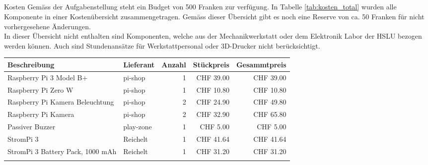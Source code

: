 \documentclass[../../main.tex]{subfiles}
\begin{document}
\subsection{}{Kosten}
Gemäss der Aufgabenstellung steht ein Budget von 500 Franken zur verfügung. In Tabelle \ref{tab:kosten_total} wurden alle Komponente in einer Kostenübersicht zusammengetragen. Gemäss dieser Übersicht gibt es noch eine Reserve von ca. 50 Franken für nicht vorhergesehene Änderungen.\\
In dieser Übersicht nicht enthalten sind Komponenten, welche aus der Mechanikwerkstatt oder dem Elektronik Labor der
HSLU bezogen werden können. Auch sind Stundenansätze für Werkstattpersonal oder 3D-Drucker nicht berücksichtigt. \\

\begin{table}[H] \centering
    \begin{tabular}{|p{6cm}|l|r|r|r|}
    \hline
    \textbf{Beschreibung}                                   & \textbf{Lieferant} & \textbf{Anzahl} & \textbf{Stückpreis} & \textbf{Gesammtpreis} \\ \hline
    Raspberry Pi 3 Model B+                                 & pi-shop            & 1               & CHF 39.00           & CHF 39.00             \\ \hline \nocite{PiShopPi3ModelBp}
    Raspberry Pi Zero W                                     & pi-shop            & 1               & CHF 10.80           & CHF 10.80             \\ \hline \nocite{PiShopPiZero}
    Raspberry Pi Kamera Beleuchtung                         & pi-shop            & 2               & CHF 24.90           & CHF 49.80             \\ \hline \nocite{PiShopBrightPi}
    Raspberry Pi Kamera                                     & pi-shop            & 2               & CHF 32.90           & CHF 65.80             \\ \hline \nocite{PiShopPiKamera}
    Passiver Buzzer                                         & play-zone          & 1               & CHF 5.00            & CHF 5.00              \\ \hline \nocite{PlayZonePassiverBuzzer}
    StromPi 3                                               & Reichelt           & 1               & CHF 41.64           & CHF 41.64             \\ \hline \nocite{ReicheltStromPi}
    StromPi 3 Battery Pack, 1000 mAh                        & Reichelt           & 1               & CHF 31.20           & CHF 31.20             \\ \hline \nocite{ReicheltStromPiAkku}

\end{tabular}
\end{table}
\end{document}
